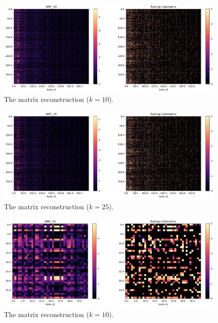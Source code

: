 \documentclass[handout]{beamer}
\begin{document}
\begin{frame}
 \begin{figure}[t]
    \includegraphics[width=\linewidth]{../image/goodreads-models/nmf-10-left.png}
    \caption[NMF-10]{The matrix reconstruction ($k=10$).}
     \label{fig:nmf-1}
\end{figure}
\end{frame}


\begin{frame}
 \begin{figure}[t]
    \includegraphics[width=\linewidth]{../image/goodreads-models/nmf-25-left.png}
    \caption[NMF-25]{The matrix reconstruction ($k=25$).}
     \label{fig:nmf-25}
\end{figure}
\end{frame}





\begin{frame}
 \begin{figure}[t]
    \includegraphics[width=\linewidth]{../image/goodreads-models/nmf-10-left-close.png}
    \caption[NMF-10-left-close]{The matrix reconstruction ($k=10$).}
     \label{fig:nmf-10-left-close}
\end{figure}
\end{frame}
\end{document}
